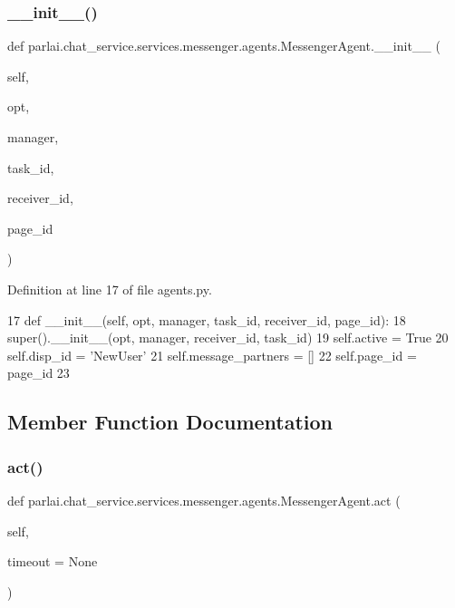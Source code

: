 \subsubsection{\texorpdfstring{\+\_\+\+\_\+init\+\_\+\+\_\+()}{\_\_init\_\_()}}
{\footnotesize\ttfamily def parlai.\+chat\+\_\+service.\+services.\+messenger.\+agents.\+Messenger\+Agent.\+\_\+\+\_\+init\+\_\+\+\_\+ (\begin{DoxyParamCaption}\item[{}]{self,  }\item[{}]{opt,  }\item[{}]{manager,  }\item[{}]{task\+\_\+id,  }\item[{}]{receiver\+\_\+id,  }\item[{}]{page\+\_\+id }\end{DoxyParamCaption})}



Definition at line 17 of file agents.\+py.


\begin{DoxyCode}
17     \textcolor{keyword}{def }\_\_init\_\_(self, opt, manager, task\_id, receiver\_id, page\_id):
18         super().\_\_init\_\_(opt, manager, receiver\_id, task\_id)
19         self.active = \textcolor{keyword}{True}
20         self.disp\_id = \textcolor{stringliteral}{'NewUser'}
21         self.message\_partners = []
22         self.page\_id = page\_id
23 
\end{DoxyCode}


\subsection{Member Function Documentation}
\mbox{\label{classparlai_1_1chat__service_1_1services_1_1messenger_1_1agents_1_1MessengerAgent_a50484a75fb326cade0cb5c2b8a0614ac}} 
\subsubsection{\texorpdfstring{act()}{act()}}
{\footnotesize\ttfamily def parlai.\+chat\+\_\+service.\+services.\+messenger.\+agents.\+Messenger\+Agent.\+act (\begin{DoxyParamCaption}\item[{}]{self,  }\item[{}]{timeout = {\ttfamily None} }\end{DoxyParamCaption})}

